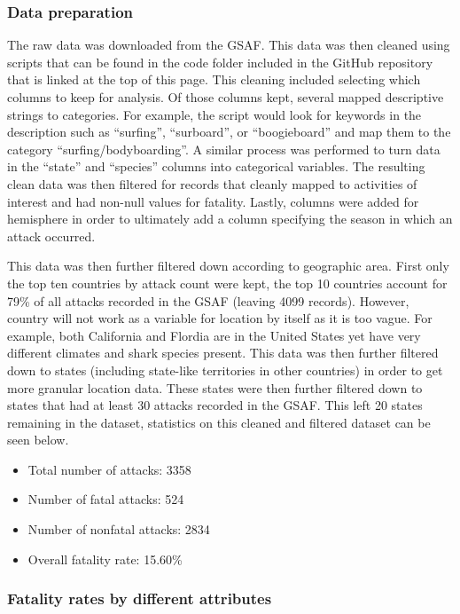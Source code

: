 \documentclass[
  letterpaper,
  DIV=11,
  numbers=noendperiod]{scrartcl}
\providecommand{\tightlist}{%
  \setlength{\itemsep}{0pt}\setlength{\parskip}{0pt}}\usepackage{longtable,booktabs,array}
\begin{document}
\subsubsection{Data preparation}\label{data-preparation}

The raw data was downloaded from the GSAF. This data was then cleaned
using scripts that can be found in the code folder included in the
GitHub repository that is linked at the top of this page. This cleaning
included selecting which columns to keep for analysis. Of those columns
kept, several mapped descriptive strings to categories. For example, the
script would look for keywords in the description such as ``surfing'',
``surboard'', or ``boogieboard'' and map them to the category
``surfing/bodyboarding''. A similar process was performed to turn data
in the ``state'' and ``species'' columns into categorical variables. The
resulting clean data was then filtered for records that cleanly mapped
to activities of interest and had non-null values for fatality. Lastly,
columns were added for hemisphere in order to ultimately add a column
specifying the season in which an attack occurred.

This data was then further filtered down according to geographic area.
First only the top ten countries by attack count were kept, the top 10
countries account for 79\% of all attacks recorded in the GSAF (leaving
4099 records). However, country will not work as a variable for location
by itself as it is too vague. For example, both California and Flordia
are in the United States yet have very different climates and shark
species present. This data was then further filtered down to states
(including state-like territories in other countries) in order to get
more granular location data. These states were then further filtered
down to states that had at least 30 attacks recorded in the GSAF. This
left 20 states remaining in the dataset, statistics on this cleaned and
filtered dataset can be seen below.

\begin{itemize}
\tightlist
\item
  Total number of attacks: 3358
\item
  Number of fatal attacks: 524
\item
  Number of nonfatal attacks: 2834
\item
  Overall fatality rate: 15.60\%
\end{itemize}

\subsubsection{Fatality rates by different
attributes}\label{fatality-rates-by-different-attributes}
\end{document}
